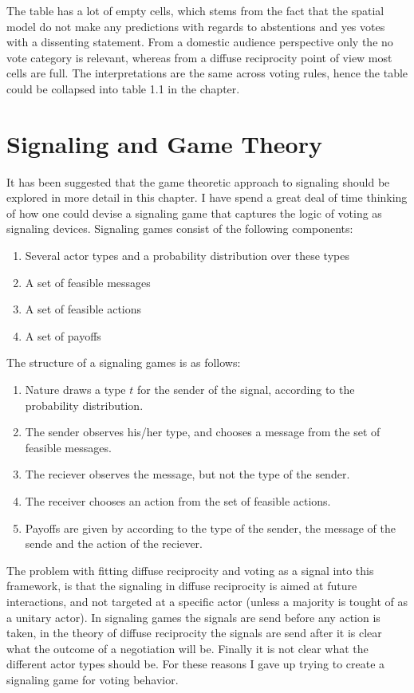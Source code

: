 \documentclass{article}
\begin{document}
The table has a lot of empty cells, which stems from the fact that the spatial model do not make any predictions with regards to abstentions and yes votes with a dissenting statement. From a domestic audience perspective only the no vote category is relevant, whereas from a diffuse reciprocity point of view most cells are full. The interpretations are the same across voting rules, hence the table could be collapsed into table 1.1 in the chapter. 

\section{Signaling and Game Theory}

It has been suggested that the game theoretic approach to signaling should be explored in more detail in this chapter. I have spend a great deal of time thinking of how one could devise a signaling game that captures the logic of voting as signaling devices. Signaling games consist of the following components:

\begin{enumerate}
\item Several actor types and a probability distribution over these types
\item A set of feasible messages
\item A set of feasible actions
\item A set of payoffs
\end{enumerate}

The structure of a signaling games is as follows:

\begin{enumerate}
\item Nature draws a type $t$ for the sender of the signal, according to the probability distribution.
\item The sender observes his/her type, and chooses a message from the set of feasible messages.
\item The reciever observes the message, but not the type of the sender. 
\item The receiver chooses an action from the set of feasible actions.
\item Payoffs are given by according to the type of the sender, the message of the sende and the action of the reciever.
\end{enumerate}

The problem with fitting diffuse reciprocity and voting as a signal into this framework, is that the signaling in diffuse reciprocity is aimed at future interactions, and not targeted at a specific actor (unless a majority is tought of as a unitary actor). In signaling games the signals are send before any action is taken, in the theory of diffuse reciprocity the signals are send after it is clear what the outcome of a negotiation will be. Finally it is not clear what the different actor types should be. For these reasons I gave up trying to create a signaling game for voting behavior. 
\end{document}
